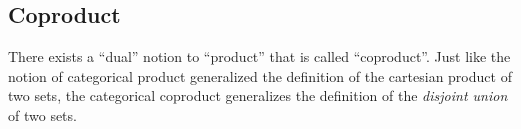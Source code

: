 
\subsection{Coproduct}
\label{sec:coproductset}

There exists a ``dual'' notion to ``product'' that is called ``coproduct''. Just like the notion of categorical product generalized the definition of the cartesian product of two sets, the categorical coproduct generalizes the definition of the \emph{disjoint union} of two sets. 
%
%
%
\begin{comment}
Suppose that we are considering a hybrid car that contains two engines: an
electric engine and an internal combustion engine. Both can produce \transmuted{motion}, but each from a different source of energy. The electric engine uses \transmuted{electric energy}; the internal combustion engine uses \transmuted{gasoline}. The situation is as in \cref{fig:e16a}.

\begin{figure}[h!]
    \centering
    \includesag{30_dpcatfig_e14}
    \caption{Alternative ways to generate $\mathsf{motion}$. \label{fig:e16a}}
\end{figure}

From this we would like to conclude that we can obtain \textsf{motion} from \textbf{either} \textsf{gasoline} \textbf{or} \textsf{electric energy} (\cref{fig:e16b}).

\begin{figure}[h!]
    \centering
    \includesag{30_dpcatfig_e15}
    \caption{We can generate $\mathsf{motion}$ from either $\mathsf{gasoline}$ or $\mathsf{electric} \ \mathsf{energy}$. \label{fig:e16b}}
\end{figure}

To define the idea of ``\textbf{either} \transmuted{food} \textbf{or} \transmuted{drink}'' we can refer to the idea of disjoint union of sets (\cref{def:disjoint-union}). 
\end{comment}


